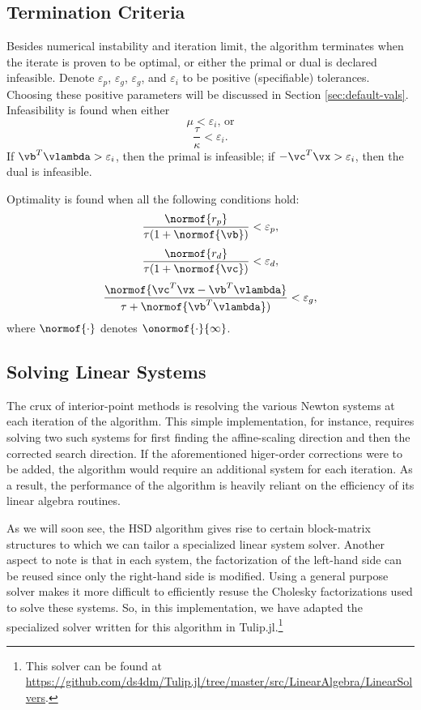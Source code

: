 \documentclass[titlepage]{abhi-tufte-handout}
\begin{document}
\subsection{Termination Criteria}\label{sec:termination}
Besides numerical instability and iteration limit, the algorithm terminates
when the iterate is proven to be optimal, or either the primal or dual is
declared infeasible.
Denote \(\varepsilon_p\), \(\varepsilon_g\), \(\varepsilon_g\),
and \(\varepsilon_i\) to be positive (specifiable) tolerances.
Choosing these positive parameters will be discussed in Section
\ref{sec:default-vals}.
Infeasibility is found when either
\[ \mu < \varepsilon_i \text{, or} \]
\[ \frac{\tau}{\kappa} < \varepsilon_i. \]
If \(\vb^T\vlambda > \varepsilon_i\), then the primal is infeasible;
if \(- \vc^T\vx > \varepsilon_i\), then the dual is infeasible.

Optimality is found when all the following conditions hold:
\[ \frac{\normof{r_p}}{\tau (1 + \normof{\vb})} < \varepsilon_p, \]
\[ \frac{\normof{r_d}}{\tau (1 + \normof{\vc})} < \varepsilon_d, \]
\[ \frac{\normof{\vc^T\vx - \vb^T\vlambda}}
        {\tau + \normof{\vb^T\vlambda})} < \varepsilon_g, \]
where \(\normof{\cdot}\) denotes \(\onormof{\cdot}{\infty}\).

\subsection{Solving Linear Systems}\label{sec:solving-linear-sys}
The crux of interior-point methods is resolving the various Newton systems at
each iteration of the algorithm. This simple implementation, for instance,
requires solving two such systems for first finding the affine-scaling
direction and then the corrected search direction. If the aforementioned
higer-order corrections were to be added, the algorithm would require an
additional system for each iteration. As a result, the performance of the
algorithm is heavily reliant on the efficiency of its linear algebra routines.

As we will soon see, the HSD algorithm gives rise to certain block-matrix
structures to which we can tailor a specialized linear system solver. Another
aspect to note is that in each system, the factorization of the left-hand side
can be reused since only the right-hand side is modified. Using a general
purpose solver makes it more difficult to efficiently resuse the Cholesky
factorizations used to solve these systems.
So, in this implementation, we have
adapted the specialized solver written for this
algorithm in Tulip.jl.\footnote{This solver can be found at
\url{https://github.com/ds4dm/Tulip.jl/tree/master/src/LinearAlgebra/LinearSolvers}.}
\end{document}
